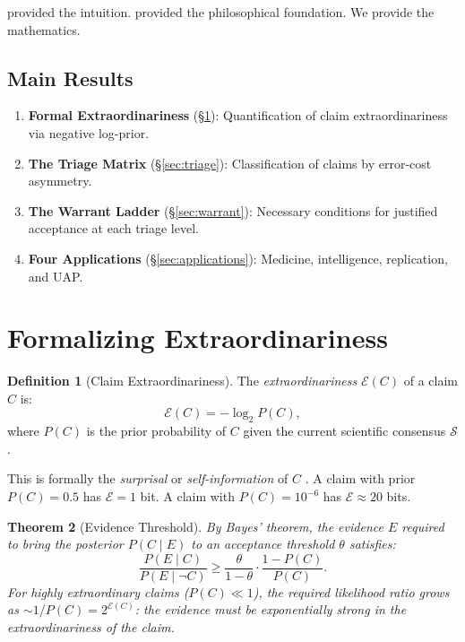 \documentclass[12pt, a4paper]{article}
\theoremstyle{plain}
\newtheorem{theorem}{Theorem}[section]
\theoremstyle{definition}
\newtheorem{definition}[theorem]{Definition}
\begin{document}
\citet{Sagan1979} provided the intuition. \citet{Hume1748} provided the
philosophical foundation. We provide the mathematics.

\subsection{Main Results}
\begin{enumerate}
  \item \textbf{Formal Extraordinariness} (\S\ref{sec:formal}):
    Quantification of claim extraordinariness via negative log-prior.
  \item \textbf{The Triage Matrix} (\S\ref{sec:triage}): Classification
    of claims by error-cost asymmetry.
  \item \textbf{The Warrant Ladder} (\S\ref{sec:warrant}): Necessary
    conditions for justified acceptance at each triage level.
  \item \textbf{Four Applications} (\S\ref{sec:applications}):
    Medicine, intelligence, replication, and UAP.
\end{enumerate}

\section{Formalizing Extraordinariness}\label{sec:formal}

\begin{definition}[Claim Extraordinariness]\label{def:extraordinary}
  The \emph{extraordinariness} $\mathcal{E}(C)$ of a claim $C$ is:
  \begin{equation}
    \mathcal{E}(C) = -\log_2 P(C),
  \end{equation}
  where $P(C)$ is the prior probability of $C$ given the current
  scientific consensus $\mathcal{S}$.
\end{definition}

\begin{remark}
  This is formally the \emph{surprisal} or \emph{self-information}
  of $C$ \citep{Shannon1948}. A claim with prior $P(C) = 0.5$ has
  $\mathcal{E} = 1$ bit. A claim with $P(C) = 10^{-6}$ has
  $\mathcal{E} \approx 20$ bits.
\end{remark}

\begin{theorem}[Evidence Threshold]\label{thm:threshold}
  By Bayes' theorem, the evidence $E$ required to bring the posterior
  $P(C \mid E)$ to an acceptance threshold $\theta$ satisfies:
  \begin{equation}\label{eq:threshold}
    \frac{P(E \mid C)}{P(E \mid \neg C)} \geq
    \frac{\theta}{1 - \theta} \cdot \frac{1 - P(C)}{P(C)}.
  \end{equation}
  For highly extraordinary claims ($P(C) \ll 1$), the required
  likelihood ratio grows as $\sim 1/P(C) = 2^{\mathcal{E}(C)}$:
  the evidence must be \emph{exponentially} strong in the
  extraordinariness of the claim.
\end{theorem}
\end{document}
